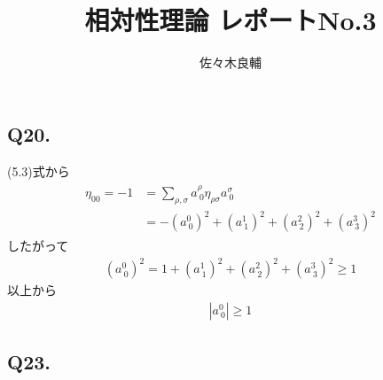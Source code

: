 \documentclass[uplatex,a4j,11pt,dvipdfmx]{jsarticle}
\begin{document}
\title{相対性理論 レポートNo.3}
\author{佐々木良輔}
\date{}
\maketitle
\subsection*{Q20.}
(5.3)式から
\begin{align}
  \begin{split}
    \eta_{00}=-1&=\sum_{\rho,\sigma}a^\rho_{\ 0}\eta_{\rho\sigma}a^\sigma_{\ 0}\\
    &=-(a^0_{\ 0})^2+(a^1_{\ 1})^2+(a^2_{\ 2})^2+(a^3_{\ 3})^2
  \end{split} 
\end{align}
したがって
\begin{align}
  (a^0_{\ 0})^2=1+(a^1_{\ 1})^2+(a^2_{\ 2})^2+(a^3_{\ 3})^2\geq 1
\end{align}
以上から
\begin{align}
  |a^0_{\ 0}|\geq 1
\end{align}
\subsection*{Q23.}

\end{document}
